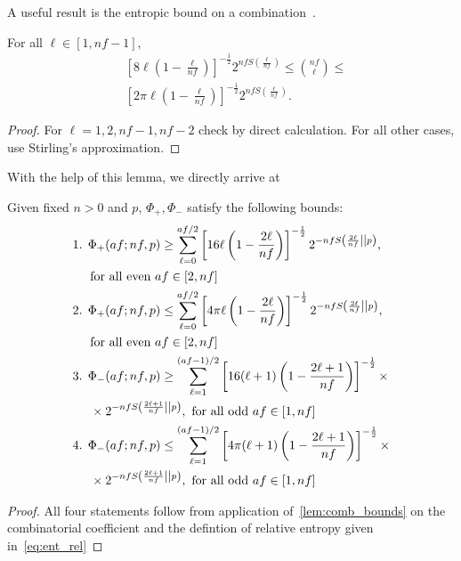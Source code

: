 A useful result is the entropic bound on a combination~\cite{cit:ash}.
\begin{lemma}\label{lem:comb_bounds}
	For all $\ell\in [1,nf-1]$,
	\begin{align}
		&\left[ 8\ell\left(1-\frac{\ell}{nf}\right) \right]^{-\frac{1}{2}} 2^{nf S\left(\frac{\ell}{nf}\right)} \leq \binom{nf}{\ell} \leq \\
		&\left[ 2\pi \ell\left(1-\frac{\ell}{nf}\right) \right]^{-\frac{1}{2}} 2^{nf S\left(\frac{\ell}{nf}\right)}.
	\end{align}
\end{lemma}
\begin{proof}
	For $\ell = 1,2, nf-1, nf-2$ check by direct calculation.	
	For all other cases, use Stirling's approximation. 
\end{proof}
With the help of this lemma, we directly arrive at 
\begin{theorem}\label{thm:bounds_strict}
	Given fixed $n>0$ and $p$, $\Phi_+, \Phi_-$ satisfy the following bounds:
	\begin{align*}
		\begin{split}
		&\text{1. } \Phi_+(af; nf, p) \geq \sum\limits_{\ell=0}^{af/2}\left[ 16\ell\left(1-\frac{2\ell}{nf}\right) \right]^{-\frac{1}{2}} 2^{-nf\ent{\frac{2\ell}{nf}}{p}}, \\
		&\hspace{14pt} \text{for all even } af\in [2,nf] \\
		&\text{2. } \Phi_+(af; nf, p) \leq \sum\limits_{\ell=0}^{af/2}\left[ 4\pi\ell\left(1-\frac{2\ell}{nf}\right) \right]^{-\frac{1}{2}} 2^{-nf\ent{\frac{2\ell}{nf}}{p}}, \\
		&\hspace{14pt} \text{for all even } af\in [2,nf] \\
		&\text{3. } \Phi_-(af; nf, p) \geq \sum\limits_{\ell=1}^{(af-1)/2}\left[ 16(\ell+1)\left(1-\frac{2\ell+1}{nf}\right) \right]^{-\frac{1}{2}} \times \\
		&\hspace{14pt} \times 2^{-nf\ent{\frac{2\ell+1}{nf}}{p}},\ \text{for all odd }af\in [1,nf] \\
		&\text{4. } \Phi_-(af; nf, p) \leq \sum\limits_{\ell=1}^{(af-1)/2}\left[ 4\pi(\ell+1)\left(1-\frac{2\ell+1}{nf}\right) \right]^{-\frac{1}{2}} \times \\
		&\hspace{14pt} \times 2^{-nf\ent{\frac{2\ell+1}{nf}}{p}},\ \text{for all odd } af\in [1,nf]
		\end{split}
	\end{align*}
\end{theorem}
\begin{proof}
	All four statements follow from application of~\cref{lem:comb_bounds} on the combinatorial coefficient and the defintion of relative entropy given in~\cref{eq:ent_rel}
\end{proof}

